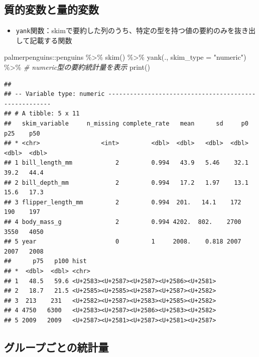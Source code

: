\documentclass[
]{ltjsarticle}
\newenvironment{Shaded}{\begin{snugshade}}{\end{snugshade}}
\newcommand{\AttributeTok}[1]{\textcolor[rgb]{0.77,0.63,0.00}{#1}}
\newcommand{\CommentTok}[1]{\textcolor[rgb]{0.56,0.35,0.01}{\textit{#1}}}
\newcommand{\FunctionTok}[1]{\textcolor[rgb]{0.00,0.00,0.00}{#1}}
\newcommand{\NormalTok}[1]{#1}
\newcommand{\SpecialCharTok}[1]{\textcolor[rgb]{0.00,0.00,0.00}{#1}}
\newcommand{\StringTok}[1]{\textcolor[rgb]{0.31,0.60,0.02}{#1}}
\providecommand{\tightlist}{%
  \setlength{\itemsep}{0pt}\setlength{\parskip}{0pt}}
\begin{document}
\hypertarget{ux8ceaux7684ux5909ux6570ux3068ux91cfux7684ux5909ux6570}{%
\subsection{質的変数と量的変数}\label{ux8ceaux7684ux5909ux6570ux3068ux91cfux7684ux5909ux6570}}

\begin{itemize}
\tightlist
\item
  \texttt{yank}関数：skimで要約した列のうち、特定の型を持つ値の要約のみを抜き出して記載する関数
\end{itemize}

\begin{Shaded}
\begin{Highlighting}[]
\NormalTok{palmerpenguins}\SpecialCharTok{::}\NormalTok{penguins }\SpecialCharTok{\%\textgreater{}\%}
  \FunctionTok{skim}\NormalTok{() }\SpecialCharTok{\%\textgreater{}\%}
  \FunctionTok{yank}\NormalTok{(., }\AttributeTok{skim\_type =} \StringTok{"numeric"}\NormalTok{) }\SpecialCharTok{\%\textgreater{}\%} \CommentTok{\# numeric型の要約統計量を表示}
  \FunctionTok{print}\NormalTok{()}
\end{Highlighting}
\end{Shaded}

\begin{verbatim}
## 
## -- Variable type: numeric ------------------------------------------------------
## # A tibble: 5 x 11
##   skim_variable     n_missing complete_rate   mean      sd     p0    p25    p50
## * <chr>                 <int>         <dbl>  <dbl>   <dbl>  <dbl>  <dbl>  <dbl>
## 1 bill_length_mm            2         0.994   43.9   5.46    32.1   39.2   44.4
## 2 bill_depth_mm             2         0.994   17.2   1.97    13.1   15.6   17.3
## 3 flipper_length_mm         2         0.994  201.   14.1    172    190    197  
## 4 body_mass_g               2         0.994 4202.  802.    2700   3550   4050  
## 5 year                      0         1     2008.    0.818 2007   2007   2008  
##      p75   p100 hist 
## *  <dbl>  <dbl> <chr>
## 1   48.5   59.6 <U+2583><U+2587><U+2587><U+2586><U+2581>
## 2   18.7   21.5 <U+2585><U+2585><U+2587><U+2587><U+2582>
## 3  213    231   <U+2582><U+2587><U+2583><U+2585><U+2582>
## 4 4750   6300   <U+2583><U+2587><U+2586><U+2583><U+2582>
## 5 2009   2009   <U+2587><U+2581><U+2587><U+2581><U+2587>
\end{verbatim}

\hypertarget{ux30b0ux30ebux30fcux30d7ux3054ux3068ux306eux7d71ux8a08ux91cf}{%
\subsection{グループごとの統計量}\label{ux30b0ux30ebux30fcux30d7ux3054ux3068ux306eux7d71ux8a08ux91cf}}
\end{document}
